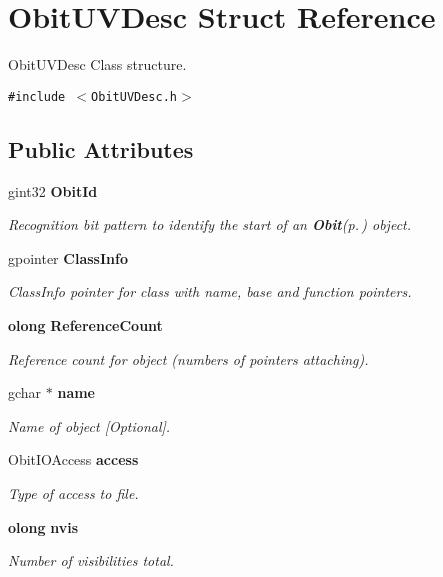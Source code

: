 \section{Obit\-UVDesc Struct Reference}
\label{structObitUVDesc}
Obit\-UVDesc Class structure.  


{\tt \#include $<$Obit\-UVDesc.h$>$}

\subsection*{Public Attributes}
\begin{CompactItemize}
\item 
gint32 {\bf Obit\-Id}
\begin{CompactList}\small\item\em Recognition bit pattern to identify the start of an {\bf Obit}{\rm (p.\,\pageref{structObit})} object. \item\end{CompactList}\item 
gpointer {\bf Class\-Info}
\begin{CompactList}\small\item\em Class\-Info pointer for class with name, base and function pointers. \item\end{CompactList}\item 
{\bf olong} {\bf Reference\-Count}
\begin{CompactList}\small\item\em Reference count for object (numbers of pointers attaching). \item\end{CompactList}\item 
gchar $\ast$ {\bf name}
\begin{CompactList}\small\item\em Name of object [Optional]. \item\end{CompactList}\item 
Obit\-IOAccess {\bf access}
\begin{CompactList}\small\item\em Type of access to file. \item\end{CompactList}\item 
{\bf olong} {\bf nvis}
\begin{CompactList}\small\item\em Number of visibilities total. \item\end{CompactList}\item 

\end{CompactItemize}
